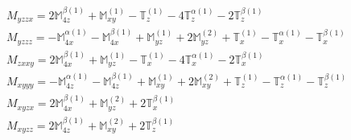 \documentclass[fleqn,8pt,landscape]{jsarticle}
\begin{document}
\begin{align*}
& M_{yzzx} = 2 \mathbb{M}_{4z}^{\beta(1)} + \mathbb{M}_{xy}^{(1)} - \mathbb{T}_{z}^{(1)} - 4 \mathbb{T}_{z}^{\alpha(1)} - 2 \mathbb{T}_{z}^{\beta(1)} \\
& M_{yzzz} = - \mathbb{M}_{4x}^{\alpha(1)} - \mathbb{M}_{4x}^{\beta(1)} + \mathbb{M}_{yz}^{(1)} + 2 \mathbb{M}_{yz}^{(2)} + \mathbb{T}_{x}^{(1)} - \mathbb{T}_{x}^{\alpha(1)} - \mathbb{T}_{x}^{\beta(1)} \\
& M_{zxxy} = 2 \mathbb{M}_{4x}^{\beta(1)} + \mathbb{M}_{yz}^{(1)} - \mathbb{T}_{x}^{(1)} - 4 \mathbb{T}_{x}^{\alpha(1)} - 2 \mathbb{T}_{x}^{\beta(1)} \\
& M_{xyyy} = - \mathbb{M}_{4z}^{\alpha(1)} - \mathbb{M}_{4z}^{\beta(1)} + \mathbb{M}_{xy}^{(1)} + 2 \mathbb{M}_{xy}^{(2)} + \mathbb{T}_{z}^{(1)} - \mathbb{T}_{z}^{\alpha(1)} - \mathbb{T}_{z}^{\beta(1)} \\
& M_{xyzx} = 2 \mathbb{M}_{4x}^{\beta(1)} + \mathbb{M}_{yz}^{(2)} + 2 \mathbb{T}_{x}^{\beta(1)} \\
& M_{xyzz} = 2 \mathbb{M}_{4z}^{\beta(1)} + \mathbb{M}_{xy}^{(2)} + 2 \mathbb{T}_{z}^{\beta(1)}
\end{align*}
\end{document}

